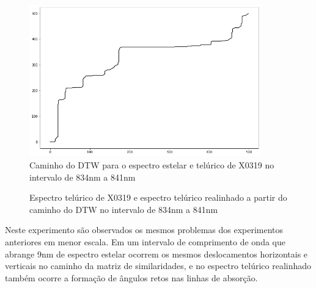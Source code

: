 \begin{figure}[htb]
\centering
\includegraphics[width=10cm]{figuras/x0319_warp_path_zoom.png}
\caption{Caminho do DTW para o espectro estelar e telúrico de X0319 no intervalo de 834nm a 841nm}
\label{fig:x0319-warp-path-zoom}
\end{figure}

\begin{figure}[H]
  \centering
  \hfill
  \caption{Espectro telúrico de X0319 e espectro telúrico realinhado a partir do caminho do DTW no intervalo de 834nm a 841nm}
  \label{fig:x0319-realigned-telluric-zoom}
\end{figure}

Neste experimento são observados os mesmos problemas dos experimentos anteriores em menor escala. Em um intervalo de comprimento de onda que abrange 9nm de espectro estelar ocorrem os mesmos deslocamentos horizontais e verticais no caminho da matriz de similaridades, e no espectro telúrico realinhado também ocorre a formação de ângulos retos nas linhas de absorção.

